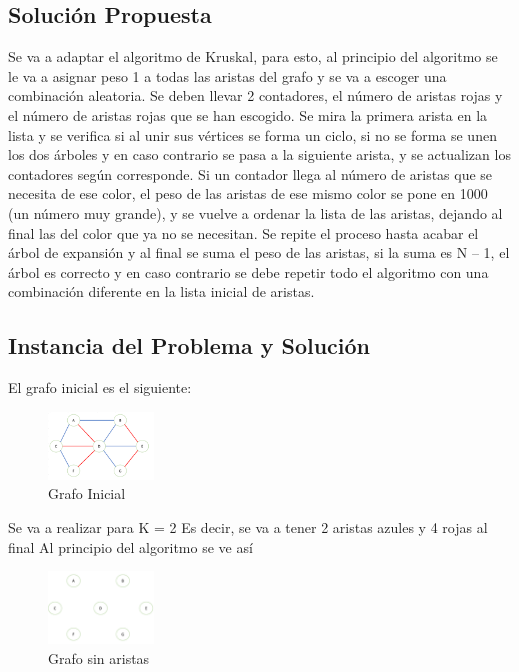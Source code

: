 \documentclass[conference,compsoc]{IEEEtran}
\begin{document}
\subsection{Solución Propuesta}
Se va a adaptar el algoritmo de Kruskal, para esto, al principio del algoritmo se le va a asignar peso 1 a todas las aristas del grafo y se va a escoger una combinación aleatoria. Se deben llevar 2 contadores, el número de aristas rojas y el número de aristas rojas que se han escogido. Se mira la primera arista en la lista y se verifica si al unir sus vértices se forma un ciclo, si no se forma se unen los dos árboles y en caso contrario se pasa a la siguiente arista, y se actualizan los contadores según corresponde. Si un contador llega al número de aristas que se necesita de ese color, el peso de las aristas de ese mismo color se pone en 1000 (un número muy grande), y se vuelve a ordenar la lista de las aristas, dejando al final las del color que ya no se necesitan. Se repite el proceso hasta acabar el árbol de expansión y al final se suma el peso de las aristas, si la suma es N – 1, el árbol es correcto y en caso contrario se debe repetir todo el algoritmo con una combinación diferente en la lista inicial de aristas.

\subsection{Instancia del Problema y Solución}


El grafo inicial es el siguiente:

\begin{figure}[h] 
    \centering
    \includegraphics[width=0.25\textwidth]{Problema2/s1.png}
    \caption{Grafo Inicial}
    \label{fig:mesh1}
\end{figure}

Se va a realizar para K = 2
Es decir, se va a tener 2 aristas azules y 4 rojas al final
Al principio del algoritmo se ve así

\begin{figure}[h] 
    \centering
    \includegraphics[width=0.25\textwidth]{Problema2/s2.png}
    \caption{Grafo sin aristas}
    \label{fig:mesh1}
\end{figure}
\end{document}
